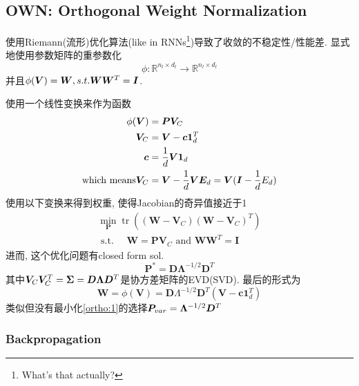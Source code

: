 \documentclass{article}
\begin{document}
\subsection{OWN: Orthogonal Weight Normalization}

\flushleft
使用Riemann(流形)优化算法(like in RNNs\footnote{
    What's that actually?
})导致了收敛的不稳定性/性能差. 显式地使用参数矩阵的重参数化
\begin{equation}
    \phi: \mathbb{R}^{n_{l} \times d_{l}} \rightarrow \mathbb{R}^{n_{l} \times d_{l}}
\end{equation}
并且$\phi(\boldsymbol{V})=\boldsymbol{W}, s.t. \boldsymbol{W}\boldsymbol{W}^T=\boldsymbol{I}$.

使用一个线性变换来作为函数
\begin{align}
    \phi(\boldsymbol{V})&=\boldsymbol{P} \boldsymbol{V}_C\\
    \boldsymbol{V}_C&= \boldsymbol{V} - \boldsymbol{c} \boldsymbol{1}_d^T\\
    \boldsymbol{c}&= \frac{1}{d}\boldsymbol{V}\boldsymbol{1}_d\\
    \text{which means} \boldsymbol{V}_C&=\boldsymbol{V} - \frac{1}{d} \boldsymbol{V} \boldsymbol{E}_d=\boldsymbol{V}(\boldsymbol{I} - \frac{1}{d}E_d)
\end{align}
使用以下变换来得到权重, 使得Jacobian的奇异值接近于1
\begin{equation}
    \begin{array}{c}
    \min _{\mathbf{P}} \operatorname{tr}\left(\left(\mathbf{W}-\mathbf{V}_{C}\right)\left(\mathbf{W}-\mathbf{V}_{C}\right)^{T}\right) \\
    \text { s.t. } \quad \mathbf{W}=\mathbf{P} \mathbf{V}_{C} \text { and } \mathbf{W} \mathbf{W}^{T}=\mathbf{I}
    \end{array}
    \label{ortho:1}
\end{equation}  
进而, 这个优化问题有closed form sol. 
\begin{equation}
    \mathbf{P}^{*}=\mathbf{D} \bm \Lambda^{-1 / 2} \mathbf{D}^{T}
\end{equation}
其中$\boldsymbol{V}_C \boldsymbol{V}_C^T=\bm \Sigma=\boldsymbol{D}\bm \Lambda \boldsymbol{D}^T$是协方差矩阵的EVD(SVD). 
最后的形式为
\begin{equation}
    \mathbf{W}=\phi(\mathbf{V})=\mathbf{D} \Lambda^{-1 / 2} \mathbf{D}^{T}\left(\mathbf{V}-\mathbf{c} \mathbf{1}_{d}^{T}\right)
\end{equation}
类似但没有最小化\eqref{ortho:1}的选择$\boldsymbol{P}_{var}=\bm \Lambda^{-1/2}\boldsymbol{D}^T$

\subsubsection{Backpropagation}
\end{document}
